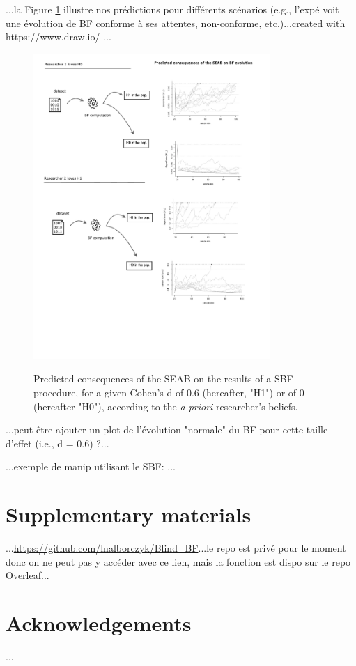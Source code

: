 \documentclass[a4paper,man,natbib,floatsintext]{apa6}
\begin{document}
...la Figure \ref{fig:pred} illustre nos prédictions pour différents scénarios (e.g., l'expé voit une évolution de BF conforme à ses attentes, non-conforme, etc.)...created with https://www.draw.io/ ...

\begin{figure}[H]
  \caption{Predicted consequences of the SEAB on the results of a SBF procedure, for a given Cohen's d of 0.6 (hereafter, "H1") or of 0 (hereafter "H0"), according to the \emph{a priori} researcher's beliefs.}
  \centering
  \includegraphics[width=0.8\textwidth]{BFF_predictions.pdf}
  \label{fig:pred}
\end{figure}

...peut-être ajouter un plot de l'évolution "normale" du BF pour cette taille d'effet (i.e., d = 0.6) ?...

...exemple de manip utilisant le SBF: \cite{martin_perceiving_2016}...

\section{Supplementary materials}

...\url{https://github.com/lnalborczyk/Blind_BF}...le repo est privé pour le moment donc on ne peut pas y accéder avec ce lien, mais la fonction est dispo sur le repo Overleaf...

\section{Acknowledgements}

...



\end{document}
